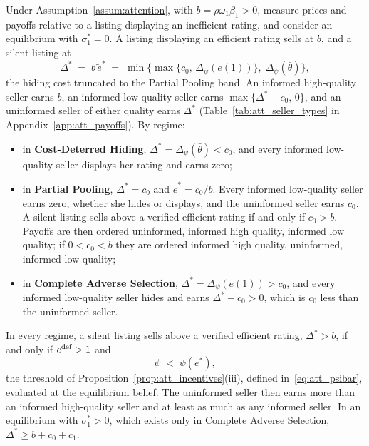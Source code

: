 \begin{proposition}
\label{prop:att_seller_types}
Under Assumption~\ref{assum:attention}, with $b=\rho\omega_1\beta_1>0$, measure prices and payoffs relative to a listing displaying an inefficient rating, and consider an equilibrium with $\sigma_1^*=0$. A listing displaying an efficient rating sells at $b$, and a silent listing at
\begin{equation}
    \Delta^*\;=\;b\,\tilde e^*\;=\;\min\Big\{\max\big\{c_0,\,\Delta_\psi(e(1))\big\},\;\Delta_\psi(\bar\theta)\Big\},
    \label{eq:att_premium_trunc}
\end{equation}
the hiding cost truncated to the Partial Pooling band. An informed high-quality seller earns $b$, an informed low-quality seller earns $\max\{\Delta^*-c_0,\,0\}$, and an uninformed seller of either quality earns $\Delta^*$ (Table~\ref{tab:att_seller_types} in Appendix~\ref{app:att_payoffs}). By regime:
\begin{itemize}
    \item in \textbf{Cost-Deterred Hiding}, $\Delta^*=\Delta_\psi(\bar\theta)<c_0$, and every informed low-quality seller displays her rating and earns zero;
    \item in \textbf{Partial Pooling}, $\Delta^*=c_0$ and $\tilde e^*=c_0/b$. Every informed low-quality seller earns zero, whether she hides or displays, and the uninformed seller earns $c_0$. A silent listing sells above a verified efficient rating if and only if $c_0>b$. Payoffs are then ordered uninformed, informed high quality, informed low quality; if $0<c_0<b$ they are ordered informed high quality, uninformed, informed low quality;
    \item in \textbf{Complete Adverse Selection}, $\Delta^*=\Delta_\psi(e(1))>c_0$, and every informed low-quality seller hides and earns $\Delta^*-c_0>0$, which is $c_0$ less than the uninformed seller.
\end{itemize}
In every regime, a silent listing sells above a verified efficient rating, $\Delta^*>b$, if and only if $e^{\rm def}>1$ and
\begin{equation}
    \psi\;<\;\bar\psi(e^*),
\end{equation}
the threshold of Proposition~\ref{prop:att_incentives}(iii), defined in~\eqref{eq:att_psibar}, evaluated at the equilibrium belief. The uninformed seller then earns more than an informed high-quality seller and at least as much as any informed seller. In an equilibrium with $\sigma_1^*>0$, which exists only in Complete Adverse Selection, $\Delta^*\ge b+c_0+c_1$.
\end{proposition}

